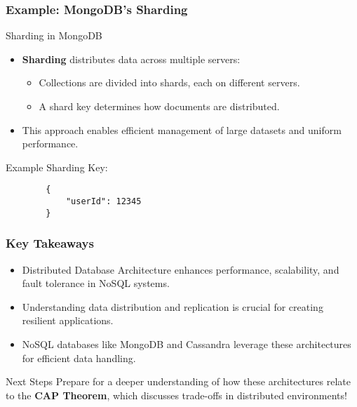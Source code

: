 \documentclass[aspectratio=169]{beamer}
\begin{document}
\begin{frame}[fragile]
    \frametitle{Example: MongoDB's Sharding}
    \begin{block}{Sharding in MongoDB}
        \begin{itemize}
            \item \textbf{Sharding} distributes data across multiple servers:
            \begin{itemize}
                \item Collections are divided into shards, each on different servers.
                \item A shard key determines how documents are distributed.
            \end{itemize}
            \item This approach enables efficient management of large datasets and uniform performance.
        \end{itemize}
    \end{block}
    
    \begin{example}
        Example Sharding Key:
        \begin{lstlisting}
        {
            "userId": 12345
        }
        \end{lstlisting}
    \end{example}
\end{frame}

\begin{frame}[fragile]
    \frametitle{Key Takeaways}
    \begin{itemize}
        \item Distributed Database Architecture enhances performance, scalability, and fault tolerance in NoSQL systems.
        \item Understanding data distribution and replication is crucial for creating resilient applications.
        \item NoSQL databases like MongoDB and Cassandra leverage these architectures for efficient data handling.
    \end{itemize}
    
    \begin{block}{Next Steps}
        Prepare for a deeper understanding of how these architectures relate to the \textbf{CAP Theorem}, which discusses trade-offs in distributed environments!
    \end{block}
\end{frame}
\end{document}

